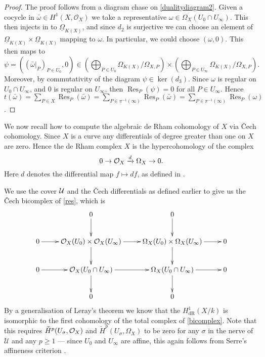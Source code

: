 \documentclass[draft, 11pt]{article} %
\theoremstyle{plain}
\theoremstyle{remark}
\newcommand{\cO}{{\cal O}}
\newcommand{\cU}{{\mathcal U}}
\newcommand{\cech}{\v{C}ech }
\newcommand{\hone}{H^1(X,\mathcal{O}_X)}
\newcommand{\derhamhone}{H_{\text {dR}}^1(X/k)}
\DeclareMathOperator{\res}{Res}
\begin{document}
\begin{proof}
The proof follows from a diagram chase on \eqref{dualitydiagram2}.
Given a cocycle in $\bar \omega \in \hone$ we take a representative $\omega \in \Omega_X(U_0 \cap U_\infty)$.
This then injects in to $\underline{\Omega}_{K(X)}$, and since $d_2$ is surjective we can choose an element of $\underline{\Omega}_{K(X)} \times \underline{\Omega}_{K(X)}$ mapping to $\omega$.
In particular, we could choose $(\omega,0)$.
This then maps to 
\[
\psi = ((\bar{\omega}|_P)_{P\in U_0}, 0) \in \left( \bigoplus_{P \in U_0} \Omega_{K(X)}/\Omega_{X,P}\right) \times \left( \bigoplus_{P \in U_\infty} \Omega_{K(X)}/\Omega_{X,P} \right).
\]
Moreover, by commutativity of the diagram $\psi \in \ker(d_3)$.
Since $\omega$ is regular on $U_0 \cap U_\infty$, and $0$ is regular on $U_\infty$, then $\res_P(\psi) = 0$ for all $P \in U_\infty$.
Hence $t(\bar \omega) = \sum_{P \in X}\res_P(\bar \omega) = \sum_{P \in \pi^{-1}(\infty)} \res_P(\bar \omega) = \sum_{P \in \pi^{-1}(\infty)} \res_P(\omega)$.
\end{proof}

We now recall how to compute the algebraic de Rham cohomology of $X$ via \cech cohomology.
Since $X$ is a curve any differentials of degree greater than one on $X$ are zero.
Hence the de Rham complex $X$ is the hypercohomology of the complex
\begin{equation}\label{res}
0 \rightarrow \cO_X \xrightarrow{d} \Omega_X \rightarrow 0.
\end{equation}
Here $d$ denotes the differential map $f \mapsto df$, as defined in \cite[Chap II, \S 8, Pg. 172]{hart}.

We use the cover $\cal U$ and the \cech differentials as defined earlier to give us the \cech bicomplex of \eqref{res}, which is
\begin{equation}\label{bicomplex}
\xymatrix{ & 0 \ar[d] & 0 \ar[d] & \\
0 \ar[r] & \cO_X(U_0) \times \cO_X(U_\infty) \ar[d] \ar[r] & \Omega_X(U_0) \times \Omega_X(U_\infty) \ar[d] \ar[r] & 0 \\
0 \ar[r] & \cO_X(U_0\cap U_\infty) \ar[d] \ar[r] & \Omega_X(U_0 \cap U_\infty) \ar[r] \ar[d] & 0 \\
& 0 & 0 &}
\end{equation}
By a generalisation of Leray's theorem \cite[Cor 12.4.7]{EGA0III} we know that the $\derhamhone$ is isomorphic to the first cohomology of the total complex of \eqref{bicomplex}.
Note that this requires ${\check H}^p(U_\sigma, \cO_X)$ and ${\check H}^p(U_\sigma, \Omega_X)$ to be zero for any $\sigma$ in the nerve of $\cU$ and any $p \geq 1$ ---
since $U_0$ and $U_\infty$ are affine, this again follows from Serre's affineness criterion \cite[Thm 5.2.23]{liu}.
\end{document}
